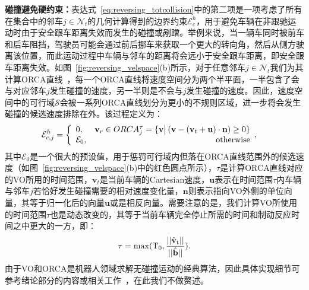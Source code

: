 \textbf{碰撞避免硬约束：}表达式~\ref{eq:reversing_totcollision}中的第二项是一项考虑了所有在集合中的邻车$j \in \mathcal{N}_{t}$的几何计算得到的边界约束$\mathcal{E}^{h}_{c}$，用于避免车辆在非跟驰运动时由于安全跟车距离失效而发生的碰撞或剐蹭。举例来说，当一辆车同时被前车和后车阻挡，驾驶员可能会通过前后挪车来获取一个更大的转向角，然后从侧方驶离该位置，而此运动过程中车辆与邻车的距离将会远小于安全跟车距离，即安全跟车距离失效。如图~\ref{fig:reversing_velspace}(b)所示，对于任意邻车$j \in \mathcal{N}_{t}$我们为其计算ORCA直线~\cite{van2011reciprocal}，每一个ORCA直线将速度空间分为两个半平面，一半包含了会与对应邻车$j$发生碰撞的速度，另一半则是不会与$j$发生碰撞的速度。因此，速度空间中的可行域$\mathcal{S}$会被一系列ORCA直线划分为更小的不规则区域，进一步将会发生碰撞的候选速度排除在外。该过程定义为：
\begin{equation}
\setlength\abovedisplayskip{10pt}
\setlength\belowdisplayskip{10pt}
\label{eq:reversing_hardcollision}
\begin{aligned}
    & \mathcal{E}^{h}_{c,j} = \left\{
        \begin{array}{lr}
        0, & \textbf{v}_{r} \in ORCA^{\tau}_{j} = \{ \textbf{v} \big| \left( \textbf{v} - (\textbf{v}_{t} + \textbf{u}) \cdot \textbf{n} \right) \geq 0 \} \\
        \mathcal{E}_{0}, & \rm{otherwise}
        \end{array}, 
    \right. %
\end{aligned}
\end{equation}
其中$\mathcal{E}_{0}$是一个很大的预设值，用于惩罚可行域内但落在ORCA直线范围外的候选速度（如图~\ref{fig:reversing_velspace}(b)中的红色圆点所示），$\tau$是计算ORCA直线对应的VO所用的时间范围，$\textbf{v}_{t}$是当前车辆的Cartesian速度，$\textbf{u}$表示在时间范围$\tau$内车辆与邻车$j$若恰好发生碰撞需要的相对速度变化量，$\textbf{n}$则表示指向VO外侧的单位向量，其等于归一化后的向量$\textbf{u}$或是相反向量。需要注意的是，我们计算VO所使用的时间范围$\tau$也是动态改变的，其等于当前车辆完全停止所需的时间和制动反应时间之中更大的一方，即：
\begin{equation}
\setlength\abovedisplayskip{10pt}
\setlength\belowdisplayskip{10pt}
\label{eq:reversing_tau}
    \tau = \rm{max}(T_{0}, \frac{|| \hat{\textbf{v}}_{t} ||}{|| \hat{\textbf{b}} ||}).
\end{equation}
由于VO和ORCA是机器人领域求解无碰撞运动的经典算法，因此具体实现细节可参考绪论部分的内容或相关工作~\cite{van2008reciprocal, van2011reciprocal}，在此我们不做赘述。

